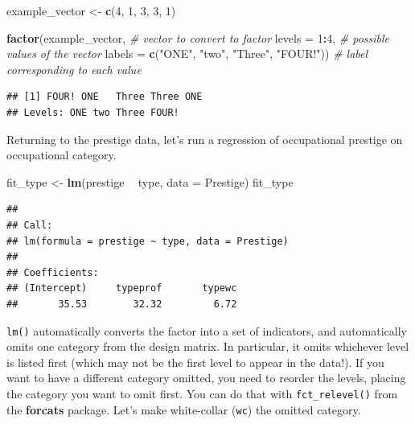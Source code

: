 \documentclass[12pt,oneside,openany]{book}
\newenvironment{Shaded}{\begin{snugshade}}{\end{snugshade}}
\newcommand{\KeywordTok}[1]{\textcolor[rgb]{0.13,0.29,0.53}{\textbf{#1}}}
\newcommand{\DataTypeTok}[1]{\textcolor[rgb]{0.13,0.29,0.53}{#1}}
\newcommand{\DecValTok}[1]{\textcolor[rgb]{0.00,0.00,0.81}{#1}}
\newcommand{\StringTok}[1]{\textcolor[rgb]{0.31,0.60,0.02}{#1}}
\newcommand{\CommentTok}[1]{\textcolor[rgb]{0.56,0.35,0.01}{\textit{#1}}}
\newcommand{\OperatorTok}[1]{\textcolor[rgb]{0.81,0.36,0.00}{\textbf{#1}}}
\newcommand{\NormalTok}[1]{#1}
\begin{document}
\begin{Shaded}
\begin{Highlighting}[]
\NormalTok{example_vector <-}\StringTok{ }\KeywordTok{c}\NormalTok{(}\DecValTok{4}\NormalTok{, }\DecValTok{1}\NormalTok{, }\DecValTok{3}\NormalTok{, }\DecValTok{3}\NormalTok{, }\DecValTok{1}\NormalTok{)}

\KeywordTok{factor}\NormalTok{(example_vector,  }\CommentTok{# vector to convert to factor}
       \DataTypeTok{levels =} \DecValTok{1}\OperatorTok{:}\DecValTok{4}\NormalTok{,    }\CommentTok{# possible values of the vector}
       \DataTypeTok{labels =} \KeywordTok{c}\NormalTok{(}\StringTok{"ONE"}\NormalTok{,}
                  \StringTok{"two"}\NormalTok{,}
                  \StringTok{"Three"}\NormalTok{,}
                  \StringTok{"FOUR!"}\NormalTok{))  }\CommentTok{# label corresponding to each value}
\end{Highlighting}
\end{Shaded}

\begin{verbatim}
## [1] FOUR! ONE   Three Three ONE  
## Levels: ONE two Three FOUR!
\end{verbatim}

Returning to the prestige data, let's run a regression of occupational
prestige on occupational category.

\begin{Shaded}
\begin{Highlighting}[]
\NormalTok{fit_type <-}\StringTok{ }\KeywordTok{lm}\NormalTok{(prestige }\OperatorTok{~}\StringTok{ }\NormalTok{type, }\DataTypeTok{data =}\NormalTok{ Prestige)}
\NormalTok{fit_type}
\end{Highlighting}
\end{Shaded}

\begin{verbatim}
## 
## Call:
## lm(formula = prestige ~ type, data = Prestige)
## 
## Coefficients:
## (Intercept)     typeprof       typewc  
##       35.53        32.32         6.72
\end{verbatim}

\texttt{lm()} automatically converts the factor into a set of
indicators, and automatically omits one category from the design matrix.
In particular, it omits whichever level is listed first (which may not
be the first level to appear in the data!). If you want to have a
different category omitted, you need to reorder the levels, placing the
category you want to omit first. You can do that with
\texttt{fct\_relevel()} from the \textbf{forcats} package. Let's make
white-collar (\texttt{wc}) the omitted category.
\end{document}
